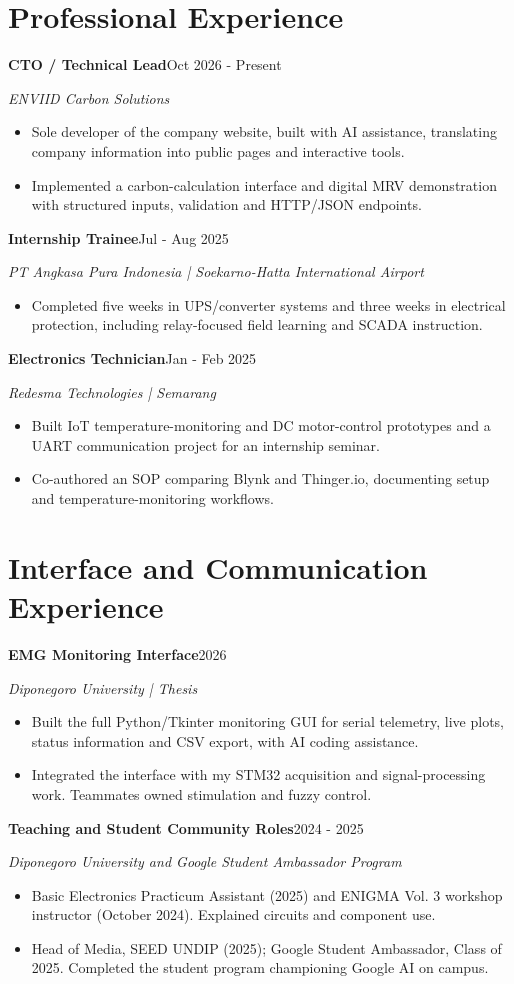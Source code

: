 \documentclass[11pt,a4paper]{article}
\newcommand{\entry}[3]{\Needspace{4\baselineskip}\textbf{#1}\hfill #2\par\textit{#3}\par}
\begin{document}
\section{Professional Experience}
\entry{CTO / Technical Lead}{Oct 2026 - Present}{ENVIID Carbon Solutions}
\begin{itemize}
\item Sole developer of the company website, built with AI assistance, translating company information into public pages and interactive tools.
\item Implemented a carbon-calculation interface and digital MRV demonstration with structured inputs, validation and HTTP/JSON endpoints.
\end{itemize}
\entry{Internship Trainee}{Jul - Aug 2025}{PT Angkasa Pura Indonesia | Soekarno-Hatta International Airport}
\begin{itemize}
\item Completed five weeks in UPS/converter systems and three weeks in electrical protection, including relay-focused field learning and SCADA instruction.
\end{itemize}
\entry{Electronics Technician}{Jan - Feb 2025}{Redesma Technologies | Semarang}
\begin{itemize}
\item Built IoT temperature-monitoring and DC motor-control prototypes and a UART communication project for an internship seminar.
\item Co-authored an SOP comparing Blynk and Thinger.io, documenting setup and temperature-monitoring workflows.
\end{itemize}
\section{Interface and Communication Experience}
\entry{EMG Monitoring Interface}{2026}{Diponegoro University | Thesis}
\begin{itemize}
\item Built the full Python/Tkinter monitoring GUI for serial telemetry, live plots, status information and CSV export, with AI coding assistance.
\item Integrated the interface with my STM32 acquisition and signal-processing work. Teammates owned stimulation and fuzzy control.
\end{itemize}
\entry{Teaching and Student Community Roles}{2024 - 2025}{Diponegoro University and Google Student Ambassador Program}
\begin{itemize}
\item Basic Electronics Practicum Assistant (2025) and ENIGMA Vol. 3 workshop instructor (October 2024). Explained circuits and component use.
\item Head of Media, SEED UNDIP (2025); Google Student Ambassador, Class of 2025. Completed the student program championing Google AI on campus.
\end{itemize}
\end{document}
